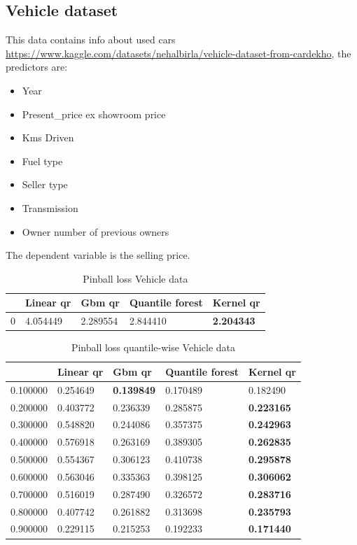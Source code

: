 \subsection{Vehicle dataset}
This data contains info about used cars \href{https://www.kaggle.com/datasets/nehalbirla/vehicle-dataset-from-cardekho}{https://www.kaggle.com/datasets/nehalbirla/vehicle-dataset-from-cardekho}, the predictors are:
\begin{itemize}
    \item Year
    \item Present\_price ex showroom price
    \item Kms Driven
    \item Fuel type
    \item Seller type
    \item Transmission
    \item Owner number of previous owners
\end{itemize}
The dependent variable is the selling price.

\begin{table}
\caption{Pinball loss Vehicle data}
\begin{tabular}{lllll}
    \toprule
     & Linear qr & Gbm qr & Quantile forest & Kernel qr \\
    \midrule
    0 & 4.054449 & 2.289554 & 2.844410 & \textbf{2.204343} \\
    \bottomrule
    \end{tabular}
\end{table}

\begin{table}
    \caption{Pinball loss quantile-wise Vehicle data}
    \begin{tabular}{lllll}
    \toprule
     & Linear qr & Gbm qr & Quantile forest & Kernel qr \\
    \midrule
    0.100000 & 0.254649 & \textbf{0.139849} & 0.170489 & 0.182490 \\
    0.200000 & 0.403772 & 0.236339 & 0.285875 & \textbf{0.223165} \\
    0.300000 & 0.548820 & 0.244086 & 0.357375 & \textbf{0.242963} \\
    0.400000 & 0.576918 & 0.263169 & 0.389305 & \textbf{0.262835} \\
    0.500000 & 0.554367 & 0.306123 & 0.410738 & \textbf{0.295878} \\
    0.600000 & 0.563046 & 0.335363 & 0.398125 & \textbf{0.306062} \\
    0.700000 & 0.516019 & 0.287490 & 0.326572 & \textbf{0.283716} \\
    0.800000 & 0.407742 & 0.261882 & 0.313698 & \textbf{0.235793} \\
    0.900000 & 0.229115 & 0.215253 & 0.192233 & \textbf{0.171440} \\
    \bottomrule
    \end{tabular}
\end{table}

